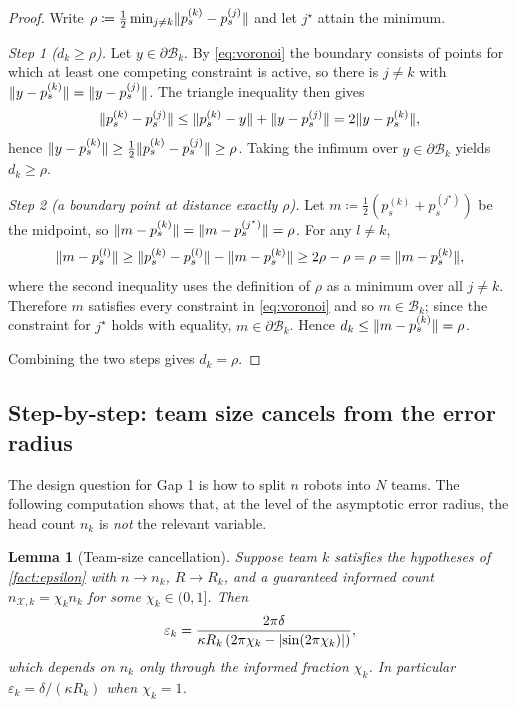 \documentclass[11pt,a4paper]{article}
\theoremstyle{plain}
\newtheorem{lemma}{Lemma}
\theoremstyle{definition}
\DeclarePairedDelimiter{\norm}{\lVert}{\rVert}
\DeclarePairedDelimiter{\abs}{\lvert}{\rvert}
\begin{document}
\begin{proof}
Write $\rho\coloneqq\frac12\min_{j\neq k}\norm{p_s^{(k)}-p_s^{(j)}}$ and let $j^\star$ attain the
minimum.

\emph{Step 1 ($d_k\geq\rho$).} Let $y\in\partial\mathcal{B}_k$. By \eqref{eq:voronoi} the
boundary consists of points for which at least one competing constraint is active, so there is
$j\neq k$ with $\norm{y-p_s^{(k)}}=\norm{y-p_s^{(j)}}$. The triangle inequality then gives
\begin{equation*}
    \norm{p_s^{(k)}-p_s^{(j)}}
    \leq\norm{p_s^{(k)}-y}+\norm{y-p_s^{(j)}}
    =2\norm{y-p_s^{(k)}},
\end{equation*}
hence $\norm{y-p_s^{(k)}}\geq\frac12\norm{p_s^{(k)}-p_s^{(j)}}\geq\rho$. Taking the infimum over
$y\in\partial\mathcal{B}_k$ yields $d_k\geq\rho$.

\emph{Step 2 (a boundary point at distance exactly $\rho$).} Let
$m\coloneqq\frac12\left(p_s^{(k)}+p_s^{(j^\star)}\right)$ be the midpoint, so
$\norm{m-p_s^{(k)}}=\norm{m-p_s^{(j^\star)}}=\rho$. For any $l\neq k$,
\begin{equation*}
    \norm{m-p_s^{(l)}}
    \geq\norm{p_s^{(k)}-p_s^{(l)}}-\norm{m-p_s^{(k)}}
    \geq2\rho-\rho=\rho=\norm{m-p_s^{(k)}},
\end{equation*}
where the second inequality uses the definition of $\rho$ as a minimum over all $j\neq k$.
Therefore $m$ satisfies every constraint in \eqref{eq:voronoi} and so $m\in\mathcal{B}_k$; since
the constraint for $j^\star$ holds with equality, $m\in\partial\mathcal{B}_k$. Hence
$d_k\leq\norm{m-p_s^{(k)}}=\rho$.

Combining the two steps gives $d_k=\rho$.
\end{proof}

\subsection{Step-by-step: team size cancels from the error radius}\label{sec:gap1-scaling}

The design question for Gap 1 is how to split $n$ robots into $N$ teams. The following
computation shows that, at the level of the asymptotic error radius, the head count $n_k$ is
\emph{not} the relevant variable.

\begin{lemma}[Team-size cancellation]\label{lem:team-scaling}
Suppose team $k$ satisfies the hypotheses of \cref{fact:epsilon} with $n\to n_k$,
$R\to R_k$, and a guaranteed informed count $n_{\mathcal X,k}=\chi_kn_k$ for some
$\chi_k\in(0,1]$. Then
\begin{equation}\label{eq:team-epsilon-scale}
    \varepsilon_k
    =\frac{2\pi\delta}{\kappa R_k\left(2\pi\chi_k-\abs{\sin\!\left(2\pi\chi_k\right)}\right)},
\end{equation}
which depends on $n_k$ only through the informed \emph{fraction} $\chi_k$. In particular
$\varepsilon_k=\delta/(\kappa R_k)$ when $\chi_k=1$.
\end{lemma}
\end{document}
